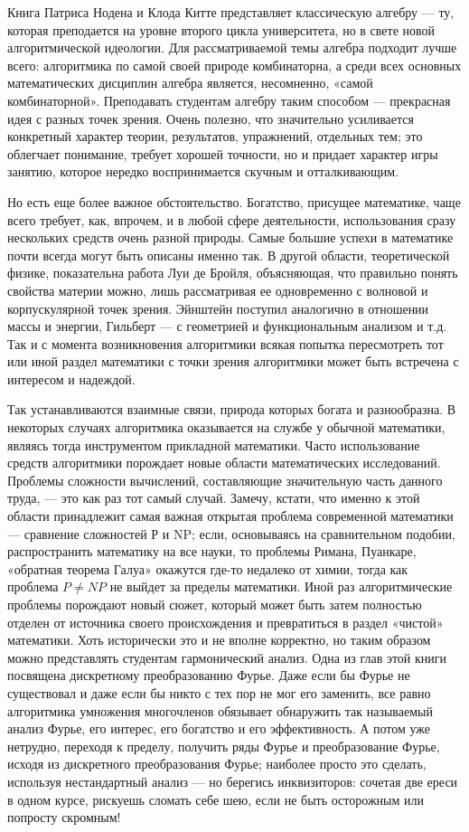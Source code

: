 \documentclass{mai_book}
\begin{document}
{{   Книга Патриса Нодена и Клода Китте представляет классическую алгебру — ту, которая преподается на уровне второго цикла университета, но в свете новой алгоритмической идеологии. Для рассматриваемой темы алгебра подходит лучше всего: алгоритмика по самой своей природе комбинаторна, а среди всех основных математических дисциплин алгебра является, несомненно, «самой комбинаторной». Преподавать студентам алгебру таким способом — прекрасная идея с разных точек зрения. Очень полезно, что значительно усиливается конкретный характер теории, результатов, упражнений, отдельных тем; это облегчает понимание, требует хорошей точности, но и придает характер игры занятию, которое нередко воспринимается скучным и отталкивающим.

   Но есть еще более важное обстоятельство. Богатство, присущее математике, чаще всего требует, как, впрочем, и в любой сфере деятельности, использования сразу нескольких средств очень разной природы. Самые большие успехи в математике почти всегда могут быть описаны именно так. В другой области, теоретической физике, показательна работа Луи де Бройля, объясняющая, что правильно понять свойства материи можно, лишь рассматривая ее одновременно с волновой и корпускулярной точек зрения. Эйнштейн поступил аналогично в отношении массы и энергии, Гильберт — с геометрией и функциональным анализом и т.д. Так и с момента возникновения алгоритмики всякая попытка пересмотреть тот или иной раздел математики с точки зрения алгоритмики может быть встречена с интересом и надеждой.

   Так устанавливаются взаимные связи, природа которых богата и разнообразна. В некоторых случаях алгоритмика оказывается на службе у обычной математики, являясь тогда инструментом прикладной математики. Часто использование средств алгоритмики порождает новые области математических исследований. Проблемы сложности вычислений, составляющие значительную часть данного труда, — это как раз тот самый случай. Замечу, кстати, что именно к этой области принадлежит самая важная открытая проблема современной математики — сравнение сложностей Р и NP; если, основываясь на сравнительном подобии, распространить математику на все науки, то проблемы Римана, Пуанкаре, «обратная теорема Галуа» окажутся где-то недалеко от химии, тогда как проблема $P \neq N P$ не выйдет за пределы математики.
\newpage
   Иной раз алгоритмические проблемы порождают новый сюжет, который может быть затем полностью отделен от источника своего происхождения и превратиться в раздел «чистой» математики. Хоть исторически это и не вполне корректно, но таким образом можно представлять студентам гармонический анализ. Одна из глав этой книги посвящена дискретному преобразованию Фурье. Даже если бы Фурье не существовал и даже если бы никто с тех пор не мог его заменить, все равно алгоритмика умножения многочленов обязывает обнаружить так называемый анализ Фурье, его интерес, его богатство и его эффективность. А потом уже нетрудно, переходя к пределу, получить ряды Фурье и преобразование Фурье, исходя из дискретного преобразования Фурье; наиболее просто это сделать, используя нестандартный анализ — но берегись инквизиторов: сочетая две ереси в одном курсе, рискуешь сломать себе шею, если не быть осторожным или попросту скромным!

}}
\end{document}
